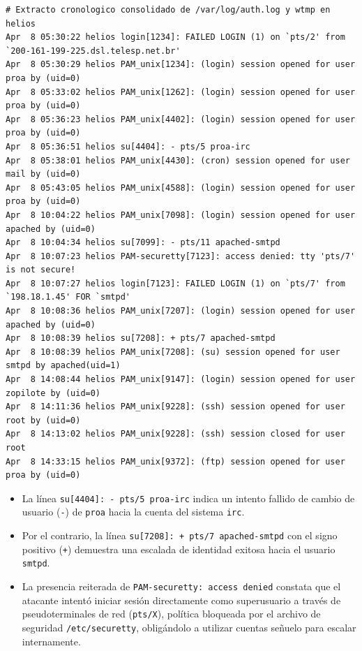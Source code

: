 \begin{lstlisting}[style=terminal]
# Extracto cronologico consolidado de /var/log/auth.log y wtmp en helios
Apr  8 05:30:22 helios login[1234]: FAILED LOGIN (1) on `pts/2' from `200-161-199-225.dsl.telesp.net.br'
Apr  8 05:30:29 helios PAM_unix[1234]: (login) session opened for user proa by (uid=0)
Apr  8 05:33:02 helios PAM_unix[1262]: (login) session opened for user proa by (uid=0)
Apr  8 05:36:23 helios PAM_unix[4402]: (login) session opened for user proa by (uid=0)
Apr  8 05:36:51 helios su[4404]: - pts/5 proa-irc
Apr  8 05:38:01 helios PAM_unix[4430]: (cron) session opened for user mail by (uid=0)
Apr  8 05:43:05 helios PAM_unix[4588]: (login) session opened for user proa by (uid=0)
Apr  8 10:04:22 helios PAM_unix[7098]: (login) session opened for user apached by (uid=0)
Apr  8 10:04:34 helios su[7099]: - pts/11 apached-smtpd
Apr  8 10:07:23 helios PAM-securetty[7123]: access denied: tty 'pts/7' is not secure!
Apr  8 10:07:27 helios login[7123]: FAILED LOGIN (1) on `pts/7' from `198.18.1.45' FOR `smtpd'
Apr  8 10:08:36 helios PAM_unix[7207]: (login) session opened for user apached by (uid=0)
Apr  8 10:08:39 helios su[7208]: + pts/7 apached-smtpd
Apr  8 10:08:39 helios PAM_unix[7208]: (su) session opened for user smtpd by apached(uid=1)
Apr  8 14:08:44 helios PAM_unix[9147]: (login) session opened for user zopilote by (uid=0)
Apr  8 14:11:36 helios PAM_unix[9228]: (ssh) session opened for user root by (uid=0)
Apr  8 14:13:02 helios PAM_unix[9228]: (ssh) session closed for user root
Apr  8 14:33:15 helios PAM_unix[9372]: (ftp) session opened for user proa by (uid=0)
\end{lstlisting}

\begin{notaforense}
\begin{itemize}
    \item La línea \texttt{su[4404]: - pts/5 proa-irc} indica un intento fallido de cambio de usuario (\texttt{-}) de \texttt{proa} hacia la cuenta del sistema \texttt{irc}.
    \item Por el contrario, la línea \texttt{su[7208]: + pts/7 apached-smtpd} con el signo positivo (\texttt{+}) demuestra una escalada de identidad exitosa hacia el usuario \texttt{smtpd}.
    \item La presencia reiterada de \texttt{PAM-securetty: access denied} constata que el atacante intentó iniciar sesión directamente como superusuario a través de pseudoterminales de red (\texttt{pts/X}), política bloqueada por el archivo de seguridad \texttt{/etc/securetty}, obligándolo a utilizar cuentas señuelo para escalar internamente.
\end{itemize}
\end{notaforense}

